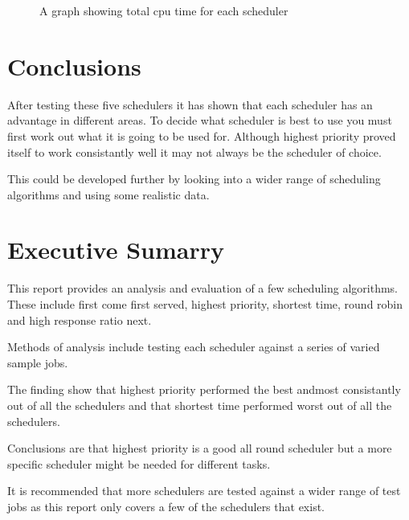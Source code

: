 \documentclass{acm_proc_article-sp}
\begin{document}
\begin{figure}
\centering
{}
\caption{A graph showing total cpu time for each scheduler}
\end{figure}

\section{Conclusions}
After testing these five schedulers it has shown that each scheduler has an advantage in different areas. To decide what scheduler is best to use you must first work out what it is going to be used for. Although highest priority proved itself to work consistantly well it may not always be the scheduler of choice.

This could be developed further by looking into a wider range of scheduling algorithms and using some realistic data.


\section{Executive Sumarry}
This report provides an analysis and evaluation of a few scheduling algorithms. These include first come first served, highest priority, shortest time, round robin and high response ratio next.

Methods of analysis include testing each scheduler against a series of varied sample jobs.

The finding show that highest priority performed the best andmost consistantly out of all the schedulers and that shortest time performed worst out of all the schedulers.

Conclusions are that highest priority is a good all round scheduler but a more specific scheduler might be needed for different tasks.

It is recommended that more schedulers are tested against a wider range of test jobs as this report only covers a few of the schedulers that exist.


\end{document}
